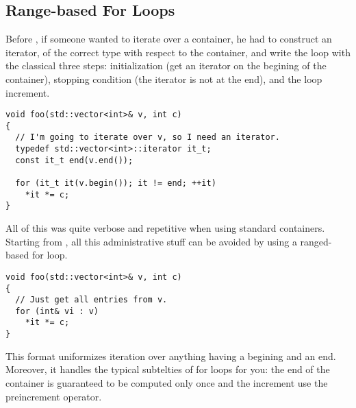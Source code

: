 \subsection{Range-based For Loops}
\label{range-based-for-loops}

Before , if someone wanted to iterate over a container, he had
to construct an iterator, of the correct type with respect to the
container, and write the loop with the classical three steps:
initialization (get an iterator on the begining of the container),
stopping condition (the iterator is not at the end), and the loop
increment.

\begin{lstlisting}
void foo(std::vector<int>& v, int c)
{
  // I'm going to iterate over v, so I need an iterator.
  typedef std::vector<int>::iterator it_t;
  const it_t end(v.end());

  for (it_t it(v.begin()); it != end; ++it)
    *it *= c;
}
\end{lstlisting}

All of this was quite verbose and repetitive when using standard
containers. Starting from , all this administrative stuff can be
avoided by using a ranged-based for loop.

\begin{lstlisting}
void foo(std::vector<int>& v, int c)
{
  // Just get all entries from v.
  for (int& vi : v)
    *it *= c;
}
\end{lstlisting}

This format uniformizes iteration over anything having a begining and
an end. Moreover, it handles the typical subtelties of for loops for
you: the end of the container is guaranteed to be computed only once
and the increment use the preincrement operator.
